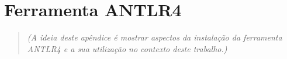 
\chapter{Ferramenta ANTLR4}
\label{anexo:isv:antlr4} %

\begin{quote}
\textit{(A ideia deste apêndice é mostrar aspectos da instalação da ferramenta ANTLR4 e a sua utilização no contexto deste trabalho.)}
\end{quote}
